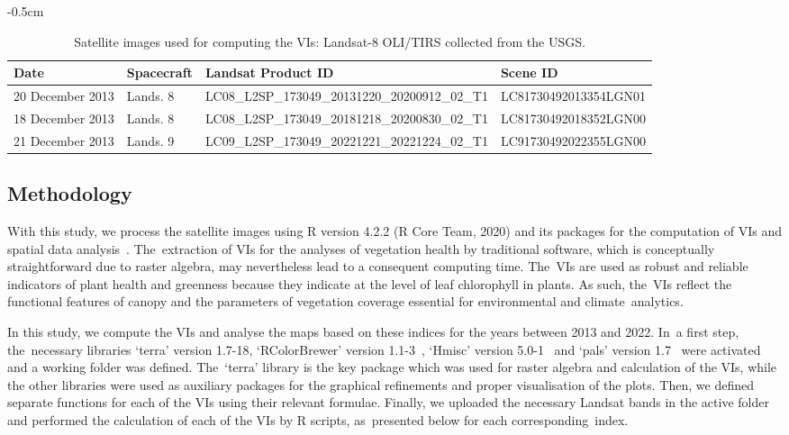 \documentclass[jimaging,article,accept,pdftex,moreauthors]{Definitions/mdpi}
\begin{document}
\begin{table}[H]
\scriptsize
\caption{Satellite %
 images used for computing the VIs: Landsat-8 OLI/TIRS collected from the USGS.\label{tab1}}
	\begin{adjustwidth}{-\extralength}{0.5cm}
		\begin{tabularx}{\fulllength}{ p{3cm}p{2cm}p{7.5cm}p{2.2cm}}
			\toprule
			\textbf{Date} & \textbf{Spacecraft} & \textbf{Landsat Product ID} & \textbf{Scene ID} \\
			\midrule
20 December 2013 & Lands. 8 & LC08\_L2SP\_173049\_20131220\_20200912\_02\_T1 & LC81730492013354LGN01 \\
18 December 2013 & Lands. 8 & LC08\_L2SP\_173049\_20181218\_20200830\_02\_T1 & LC81730492018352LGN00 \\
21 December 2013 & Lands. 9 & LC09\_L2SP\_173049\_20221221\_20221224\_02\_T1 & LC91730492022355LGN00 \\		
			\bottomrule
		\end{tabularx}
	\end{adjustwidth}
\end{table}
\unskip

\subsection{Methodology}\label{sect2.2}

With this study, we process the satellite images using R version 4.2.2 (R Core Team, 2020) and its packages for the computation of VIs and spatial data analysis~\cite{RCoreTeam}. The~extraction of VIs for the analyses of vegetation health by traditional software, which is conceptually straightforward due to raster algebra, may nevertheless lead to a consequent computing time. The~VIs are used as robust and reliable indicators of plant health and greenness because they indicate at the level of leaf chlorophyll in plants. As such, the~VIs reflect the functional features of canopy and the parameters of vegetation coverage essential for environmental and climate~analytics.

In this study, we compute the VIs and analyse the maps based on these indices for the years between 2013 and 2022. In~a first step, the~necessary libraries `terra' version 1.7-18, `RColorBrewer' version 1.1-3~\cite{Neuwirth}, `Hmisc' version 5.0-1~\cite{Hmisc} and `pals' version 1.7~\cite{Wright} were activated and a working folder was defined. The~`terra' library is the key package which was used for raster algebra and calculation of the VIs, while the other libraries were used as auxiliary packages for the graphical refinements and proper visualisation of the plots. Then, we defined separate functions for each of the VIs using their relevant formulae. Finally, we uploaded the necessary Landsat bands in the active folder and performed the calculation of each of the VIs by R scripts, as~presented below for each corresponding~index.
\end{document}
